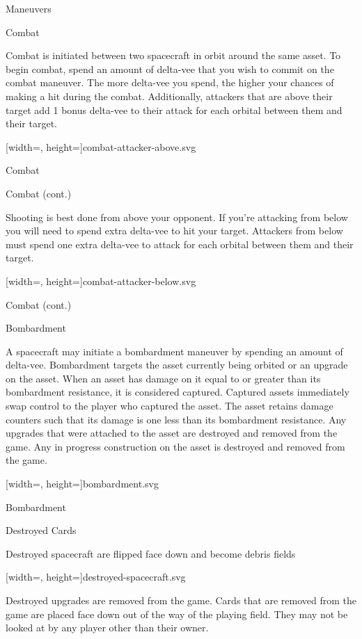 \documentclass[twoside]{minimal}
\newenvironment{section}[1]
{\renewcommand{\title}{\begin{center} \fontsize{24.88}{32}\selectfont #1 \end{center}} \ignorespaces}
{\clearpage \ignorespacesafterend}
\newenvironment{supersection}[1]
{
\renewcommand{\title}{\begin{center} \fontsize{24.88}{32}\selectfont #1 \end{center}}
\renewenvironment{section}[1]
 {\title \renewcommand{\title}{\begin{flushleft} \fontsize{20.74}{28}\selectfont ##1 \end{flushleft}} \ignorespaces}
 {\clearpage \ignorespacesafterend}
\ignorespaces
}
{\clearpage \ignorespacesafterend}
\newcommand{\full}[3]{
\begin{diagram}
    \begin{center}
    {#2[width=\textwidth, height=\textheight]{#1}}
    \caption*{#3}
    \end{center}
\end{diagram}
}
\newcommand{\fullsvg}[2]{\full{#1}{}{#2}}
\begin{document}
\begin{supersection}{Maneuvers}
    \begin{section}{Combat}
        \title

        Combat is initiated between two spacecraft in orbit around the same asset.
        To begin combat, spend an amount of delta-vee that you wish to commit on the combat maneuver.
        The more delta-vee you spend, the higher your chances of making a hit during the combat.
        Additionally, attackers that are above their target add 1 bonus delta-vee to their attack for each orbital between them and their target.

        \fullsvg{combat-attacker-above.svg}{Combat with the attacker above its target.}
    \end{section}

    \begin{section}{Combat (cont.)}
        \title

        Shooting is best done from above your opponent.
        If you're attacking from below you will need to spend extra delta-vee to hit your target.
        Attackers from below must spend one extra delta-vee to attack for each orbital between them and their target.

        \fullsvg{combat-attacker-below.svg}{Combat with the attacker below its target.}
    \end{section}

    \begin{section}{Bombardment}
        \title

        A spacecraft may initiate a bombardment maneuver by spending an amount of delta-vee.
        Bombardment targets the asset currently being orbited or an upgrade on the asset.
        When an asset has damage on it equal to or greater than its bombardment resistance, it is considered captured.
        Captured assets immediately swap control to the player who captured the asset.
        The asset retains damage counters such that its damage is one less than its bombardment resistance.
        Any upgrades that were attached to the asset are destroyed and removed from the game.
        Any in progress construction on the asset is destroyed and removed from the game.

        \fullsvg{bombardment.svg}{Asset bombardment.}

    \end{section}
\end{supersection}

\begin{section}{Destroyed Cards}
\title

Destroyed spacecraft are flipped face down and become debris fields

\fullsvg{destroyed-spacecraft.svg}{Flipping a spacecraft when it is destroyed}

Destroyed upgrades are removed from the game.
Cards that are removed from the game are placed face down out of the way of the playing field.
They may not be looked at by any player other than their owner.
\end{section}
\end{document}
